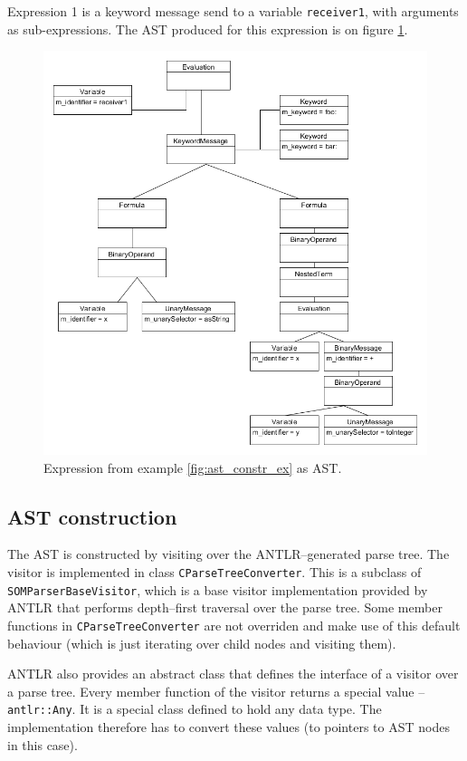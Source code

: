 \documentclass[thesis=M,english]{FITthesis}[2019/12/23]
\begin{document}
Expression 1 is a keyword message send to a variable \texttt{receiver1}, with arguments as sub-expressions. The AST produced for this expression is
on figure \ref{fig:ast_const_ex_1}.

\begin{figure}[h!]
	\centering
	\includegraphics[width=\textwidth]{media/exp_ast_1.png}
	\caption{Expression from example \ref{fig:ast_constr_ex} as AST.}
	\label{fig:ast_const_ex_1}
\end{figure}

\subsection{AST construction}
The AST is constructed by visiting over the ANTLR--generated parse tree. The visitor is implemented in class \texttt{CParseTreeConverter}. This is a subclass
of \texttt{SOMParserBaseVisitor}, which is a base visitor implementation provided by ANTLR that performs depth--first traversal over the parse tree. Some member
functions in \texttt{CParseTreeConverter} are not overriden and make use of this default behaviour (which is just iterating over child nodes and visiting them).

ANTLR also provides an abstract class that defines the interface of a visitor over a parse tree. Every member function of the visitor returns a special value --
\texttt{antlr::Any}. It is a special class defined to hold any data type. The implementation therefore has to convert these values (to pointers to AST nodes
in this case). 
\end{document}
